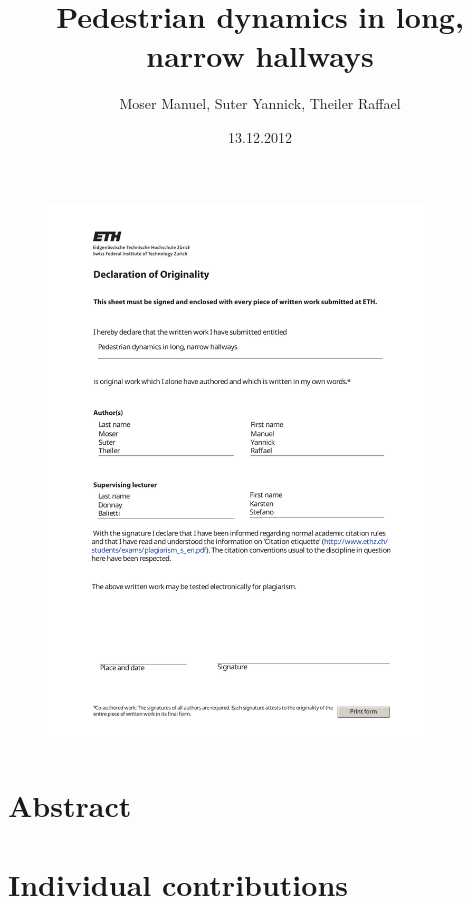 \documentclass[11pt]{article}
\title{Pedestrian dynamics in long, narrow hallways}
\author{Moser Manuel, Suter Yannick, Theiler Raffael}
\date{13.12.2012}
\begin{document}

\newpage


\newpage


\begin{figure}
	\centering
	\includegraphics[width=0.9\textwidth]{declaration_print.pdf}
	\label{fig:declaration}
\end{figure}
\clearpage


\tableofcontents
\newpage


\section{Abstract}

\newpage

\section{Individual contributions}

\newpage
\end{document}
